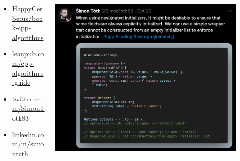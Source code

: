\documentclass[aspectratio=169]{beamer}
\begin{document}
\begin{frame}{}
\begin{columns}
\begin{column}{0.27\textwidth}
        \end{column}
        \begin{column}{0.43\textwidth}
        \small
            \begin{itemize}
                \item \href{https://github.com/HappyCerberus/book-cpp-algorithms}{HappyCerberus/book-cpp-algorithms}
                \item \href{https://leanpub.com/cpp-algorithms-guide}{leanpub.com/cpp-algorithms-guide}
            \end{itemize}
            \begin{itemize}
                \item \href{https://twitter.com/SimonToth83}{twitter.com/SimonToth83}
                \item \href{https://www.linkedin.com/in/simontoth}{linkedin.com/in/simontoth}
            \end{itemize}
        \end{column}
    \begin{column}{0.3\textwidth}
        \hspace{-1em}\includegraphics[width=1.08\textwidth]{static/tweet.png}
    \end{column}        
    \end{columns}
\end{frame}
\end{document}
